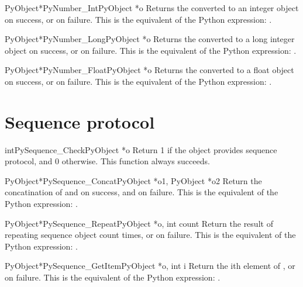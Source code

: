      \begin{cfuncdesc}{PyObject*}{PyNumber_Int}{PyObject *o}
	 Returns the  converted to an integer object on success, or
	 {\NULL} on failure.  This is the equivalent of the Python
	 expression: .
     \end{cfuncdesc}


     \begin{cfuncdesc}{PyObject*}{PyNumber_Long}{PyObject *o}
	 Returns the  converted to a long integer object on success,
	 or {\NULL} on failure.  This is the equivalent of the Python
	 expression: .
     \end{cfuncdesc}


     \begin{cfuncdesc}{PyObject*}{PyNumber_Float}{PyObject *o}
	 Returns the  converted to a float object on success, or {\NULL}
	 on failure.  This is the equivalent of the Python expression:
	 .
     \end{cfuncdesc}


\section{Sequence protocol}

     \begin{cfuncdesc}{int}{PySequence_Check}{PyObject *o}
         Return 1 if the object provides sequence protocol, and 0
	 otherwise.  
	 This function always succeeds.
     \end{cfuncdesc}


     \begin{cfuncdesc}{PyObject*}{PySequence_Concat}{PyObject *o1, PyObject *o2}
	 Return the concatination of  and  on success, and {\NULL} on
	 failure.   This is the equivalent of the Python
	 expression: .
     \end{cfuncdesc}


     \begin{cfuncdesc}{PyObject*}{PySequence_Repeat}{PyObject *o, int count}
	 Return the result of repeating sequence object  count times,
	 or {\NULL} on failure.  This is the equivalent of the Python
	 expression: .
     \end{cfuncdesc}


     \begin{cfuncdesc}{PyObject*}{PySequence_GetItem}{PyObject *o, int i}
	 Return the ith element of , or {\NULL} on failure. This is the
	 equivalent of the Python expression: .
     \end{cfuncdesc}


